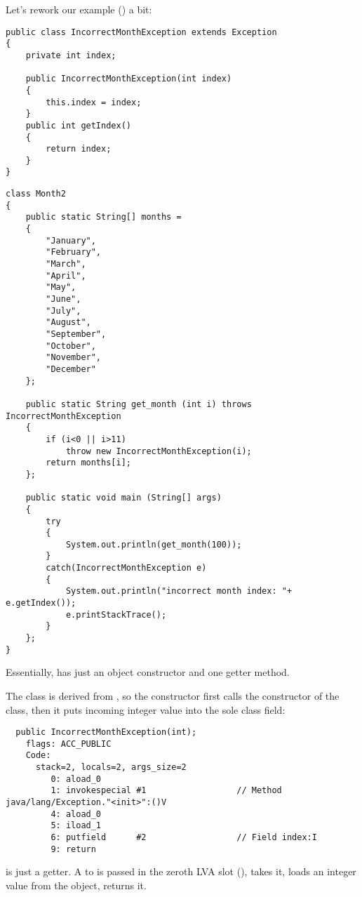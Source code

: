 
Let's rework our  example () a bit:

\begin{lstlisting}[caption=IncorrectMonthException.java]
public class IncorrectMonthException extends Exception
{
	private int index;

	public IncorrectMonthException(int index)
	{
		this.index = index;
	} 
	public int getIndex()
	{
		return index;
	}
}
\end{lstlisting}

\begin{lstlisting}[caption=Month2.java]
class Month2
{
	public static String[] months = 
	{
		"January", 
		"February", 
		"March", 
		"April",
		"May",
		"June",
		"July",
		"August",
		"September",
		"October",
		"November",
		"December"
	};

	public static String get_month (int i) throws IncorrectMonthException
	{
		if (i<0 || i>11)
			throw new IncorrectMonthException(i);
		return months[i];
	};

	public static void main (String[] args)
	{
		try
		{
			System.out.println(get_month(100));
		}
		catch(IncorrectMonthException e)
		{
			System.out.println("incorrect month index: "+ e.getIndex());
			e.printStackTrace();
		}
	};
}
\end{lstlisting}

Essentially,  has just an object constructor 
and one getter method.

The  class is derived from , 
so the  constructor
first calls the constructor of the  class, 
then it puts incoming integer value into the sole  class field:

\begin{lstlisting}
  public IncorrectMonthException(int);
    flags: ACC_PUBLIC
    Code:
      stack=2, locals=2, args_size=2
         0: aload_0       
         1: invokespecial #1                  // Method java/lang/Exception."<init>":()V
         4: aload_0       
         5: iload_1       
         6: putfield      #2                  // Field index:I
         9: return        
\end{lstlisting}

 is just a getter.
A  to  is passed in the zeroth \ac{LVA} slot
(),  takes it,  loads an integer value from the object, 
 returns it.

